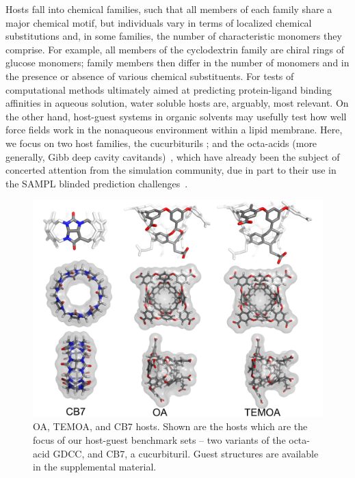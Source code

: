 \documentclass[aps,pre,twocolumn,nofootinbib,superscriptaddress,10pt, final,tightenlines]{revtex4-1}
\begin{document}
Hosts fall into chemical families, such that all members of each family share a major chemical motif, but individuals vary in terms of localized chemical substitutions and, in some families, the number of characteristic monomers they comprise.  
For example, all members of the cyclodextrin family are chiral rings of glucose monomers; family members then differ in the number of monomers and in the presence or absence of various chemical substituents. 
For tests of computational methods ultimately aimed at predicting protein-ligand binding affinities in aqueous solution, water soluble hosts are, arguably, most relevant. 
On the other hand, host-guest systems in organic solvents may usefully test how well force fields work in the nonaqueous environment within a lipid membrane. 
Here, we focus on two host families, the cucurbiturils \cite{freeman_cucurbituril_1981,mock_host-guest_1983}; and the octa-acids (more generally, Gibb deep cavity cavitands)~\cite{gibb_well-defined_2004, hillyer_synthesis_2016}, which have already been the subject of concerted attention from the simulation community, due in part to their use in the SAMPL blinded prediction challenges~\cite{muddana_sampl3_2012, muddana_sampl4_2014, yin_overview_2016}.  

\begin{figure}
\includegraphics[width=\textwidth]{figures/hosts.pdf}
\caption{\label{hosts} OA, TEMOA, and CB7 hosts. Shown are the hosts which are the focus of our host-guest benchmark sets -- two variants of the octa-acid GDCC, and CB7, a cucurbituril. Guest structures are available in the supplemental material.}
\end{figure}
\end{document}
